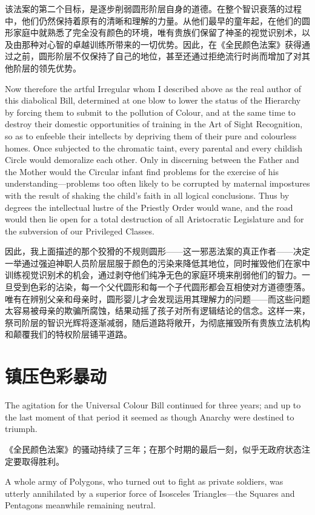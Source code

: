 \documentclass[12pt,UTF8]{ctexbook}
\begin{document}
该法案的第二个目标，是逐步削弱圆形阶层自身的道德。在整个智识衰落的过程中，他们仍然保持着原有的清晰和理解的力量。从他们最早的童年起，在他们的圆形家庭中就熟悉了完全没有颜色的环境，唯有贵族们保留了神圣的视觉识别术，以及由那种对心智的卓越训练所带来的一切优势。因此，在《全民颜色法案》获得通过之前，圆形阶层不仅保持了自己的地位，甚至还通过拒绝流行时尚而增加了对其他阶层的领先优势。

Now therefore the artful Irregular whom I described above as the real author of this diabolical Bill, determined at one blow to lower the status of the Hierarchy by forcing them to submit to the pollution of Colour, and at the same time to destroy their domestic opportunities of training in the Art of Sight Recognition, so as to enfeeble their intellects by depriving them of their pure and colourless homes. Once subjected to the chromatic taint, every parental and every childish Circle would demoralize each other. Only in discerning between the Father and the Mother would the Circular infant find problems for the exercise of his understanding---problems too often likely to be corrupted by maternal impostures with the result of shaking the child's faith in all logical conclusions. Thus by degrees the intellectual lustre of the Priestly Order would wane, and the road would then lie open for a total destruction of all Aristocratic Legislature and for the subversion of our Privileged Classes.

因此，我上面描述的那个狡猾的不规则圆形——这一邪恶法案的真正作者——决定一举通过强迫神职人员阶层屈服于颜色的污染来降低其地位，同时摧毁他们在家中训练视觉识别术的机会，通过剥夺他们纯净无色的家庭环境来削弱他们的智力。一旦受到色彩的沾染，每一个父代圆形和每一个子代圆形都会互相使对方道德堕落。唯有在辨别父亲和母亲时，圆形婴儿才会发现运用其理解力的问题——而这些问题太容易被母亲的欺骗所腐蚀，结果动摇了孩子对所有逻辑结论的信念。这样一来，祭司阶层的智识光辉将逐渐减弱，随后道路将敞开，为彻底摧毁所有贵族立法机构和颠覆我们的特权阶层铺平道路。

\chapter{镇压色彩暴动}

The agitation for the Universal Colour Bill continued for three years; and up to the last moment of that period it seemed as though Anarchy were destined to triumph.

《全民颜色法案》的骚动持续了三年；在那个时期的最后一刻，似乎无政府状态注定要取得胜利。

A whole army of Polygons, who turned out to fight as private soldiers, was utterly annihilated by a superior force of Isosceles Triangles---the Squares and Pentagons meanwhile remaining neutral.
\end{document}
